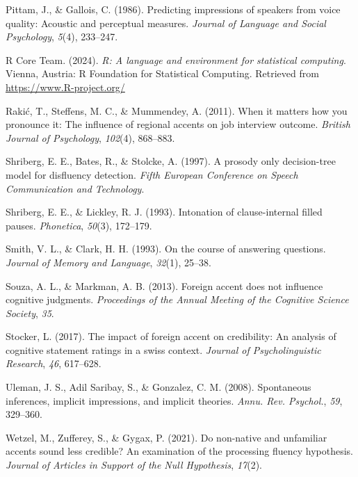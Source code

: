 \documentclass[
  man,floatsintext]{apa7}
\newlength{\cslhangindent}
\newlength{\cslentryspacingunit} %
\newenvironment{CSLReferences}[2] %
 {%
  \setlength{\parindent}{0pt}
  \ifodd #1
  \let\oldpar\par
  \def\par{\hangindent=\cslhangindent\oldpar}
  \fi
  \setlength{\parskip}{#2\cslentryspacingunit}
 }%
 {}
\begin{document}
\begin{CSLReferences}{1}{0}
\leavevmode{}%
Pittam, J., \& Gallois, C. (1986). Predicting impressions of speakers from voice quality: Acoustic and perceptual measures. \emph{Journal of Language and Social Psychology}, \emph{5}(4), 233--247.

\leavevmode{}%
R Core Team. (2024). \emph{R: A language and environment for statistical computing}. Vienna, Austria: R Foundation for Statistical Computing. Retrieved from \url{https://www.R-project.org/}

\leavevmode{}%
Rakić, T., Steffens, M. C., \& Mummendey, A. (2011). When it matters how you pronounce it: The influence of regional accents on job interview outcome. \emph{British Journal of Psychology}, \emph{102}(4), 868--883.

\leavevmode{}%
Shriberg, E. E., Bates, R., \& Stolcke, A. (1997). A prosody only decision-tree model for disfluency detection. \emph{Fifth European Conference on Speech Communication and Technology}.

\leavevmode{}%
Shriberg, E. E., \& Lickley, R. J. (1993). Intonation of clause-internal filled pauses. \emph{Phonetica}, \emph{50}(3), 172--179.

\leavevmode{}%
Smith, V. L., \& Clark, H. H. (1993). On the course of answering questions. \emph{Journal of Memory and Language}, \emph{32}(1), 25--38.

\leavevmode{}%
Souza, A. L., \& Markman, A. B. (2013). Foreign accent does not influence cognitive judgments. \emph{Proceedings of the Annual Meeting of the Cognitive Science Society}, \emph{35}.

\leavevmode{}%
Stocker, L. (2017). The impact of foreign accent on credibility: An analysis of cognitive statement ratings in a swiss context. \emph{Journal of Psycholinguistic Research}, \emph{46}, 617--628.

\leavevmode{}%
Uleman, J. S., Adil Saribay, S., \& Gonzalez, C. M. (2008). Spontaneous inferences, implicit impressions, and implicit theories. \emph{Annu. Rev. Psychol.}, \emph{59}, 329--360.

\leavevmode{}%
Wetzel, M., Zufferey, S., \& Gygax, P. (2021). Do non-native and unfamiliar accents sound less credible? An examination of the processing fluency hypothesis. \emph{Journal of Articles in Support of the Null Hypothesis}, \emph{17}(2).


\end{CSLReferences}
\end{document}
